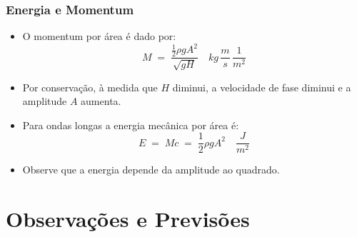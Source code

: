 \documentclass{beamer}
\begin{document}
\begin{frame}
  \frametitle{Energia e Momentum}
  \begin{itemize}\setlength{\itemsep}{1.5ex}
  \item O momentum por área é dado por:
    \[ M \; = \; \frac{\frac{1}{2}\rho g A^2}{\sqrt{gH}} 
    \quad kg\,\frac{m}{s}\,\frac{1}{m^2}\]
  \item Por conservação, à medida que $H$ diminui, a velocidade 
    de fase diminui e \alert{a amplitude $A$ aumenta.}
  \item Para ondas longas a energia mecânica por área é:
    \[ E \;=\; Mc \;=\;\frac{1}{2}\rho g A^2 \quad \frac{J}{m^2} \]
  \item Observe que a energia depende da \alert{amplitude ao
      quadrado}.
  \end{itemize}
\end{frame}
\section{Observações e Previsões}
\end{document}
